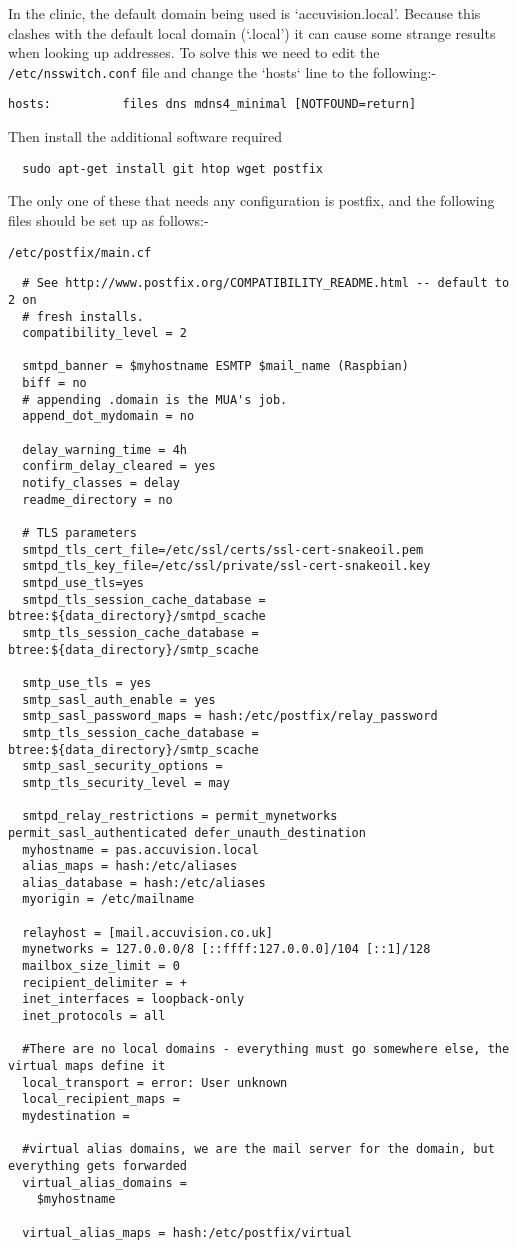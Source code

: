 \documentclass[Draft]{akc}
\begin{document}
In the clinic, the default domain being used is `accuvision.local'.  Because this clashes with the
default local domain (`.local') it can cause some strange results when looking up addresses. To
solve this we need to edit the \texttt{/etc/nsswitch.conf} file and change the `hosts` line to
the following:-

\begin{lstlisting}
hosts:          files dns mdns4_minimal [NOTFOUND=return]
\end{lstlisting}

Then install the additional software required

\begin{lstlisting}
  sudo apt-get install git htop wget postfix
  \end{lstlisting}

The only one of these that needs any configuration is postfix, and the following files
should be set up as follows:-

\texttt{/etc/postfix/main.cf}
\begin{lstlisting}
  # See http://www.postfix.org/COMPATIBILITY_README.html -- default to 2 on
  # fresh installs.
  compatibility_level = 2

  smtpd_banner = $myhostname ESMTP $mail_name (Raspbian)
  biff = no
  # appending .domain is the MUA's job.
  append_dot_mydomain = no

  delay_warning_time = 4h
  confirm_delay_cleared = yes
  notify_classes = delay
  readme_directory = no

  # TLS parameters
  smtpd_tls_cert_file=/etc/ssl/certs/ssl-cert-snakeoil.pem
  smtpd_tls_key_file=/etc/ssl/private/ssl-cert-snakeoil.key
  smtpd_use_tls=yes
  smtpd_tls_session_cache_database = btree:${data_directory}/smtpd_scache
  smtp_tls_session_cache_database = btree:${data_directory}/smtp_scache

  smtp_use_tls = yes
  smtp_sasl_auth_enable = yes
  smtp_sasl_password_maps = hash:/etc/postfix/relay_password
  smtp_tls_session_cache_database = btree:${data_directory}/smtp_scache
  smtp_sasl_security_options =
  smtp_tls_security_level = may

  smtpd_relay_restrictions = permit_mynetworks permit_sasl_authenticated defer_unauth_destination
  myhostname = pas.accuvision.local
  alias_maps = hash:/etc/aliases
  alias_database = hash:/etc/aliases
  myorigin = /etc/mailname

  relayhost = [mail.accuvision.co.uk]
  mynetworks = 127.0.0.0/8 [::ffff:127.0.0.0]/104 [::1]/128
  mailbox_size_limit = 0
  recipient_delimiter = +
  inet_interfaces = loopback-only
  inet_protocols = all

  #There are no local domains - everything must go somewhere else, the virtual maps define it
  local_transport = error: User unknown
  local_recipient_maps =
  mydestination =

  #virtual alias domains, we are the mail server for the domain, but everything gets forwarded
  virtual_alias_domains =
    $myhostname

  virtual_alias_maps = hash:/etc/postfix/virtual
\end{lstlisting}
\end{document}
